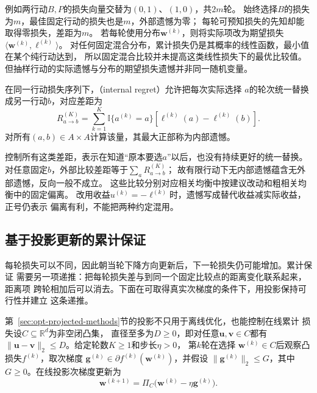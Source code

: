 例如两行动\(B,P\)的损失向量交替为\((0,1)\)、\((1,0)\)，共\(2m\)轮。
始终选择\(B\)的损失为\(m\)，最佳固定行动的损失也是\(m\)，外部遗憾为零；
每轮可预知损失的先知却能取得零损失，差距为\(m\)。
若每轮使用分布\(\bm w^{(k)}\)，则将实际项改为期望损失
\(\langle\bm w^{(k)},\bm\ell^{(k)}\rangle\)。
对任何固定混合分布，累计损失仍是其概率的线性函数，最小值在某个纯行动达到，
所以固定混合比较并未提高这类线性损失下的最优比较值。
但抽样行动的实际遗憾与分布的期望损失遗憾并非同一随机变量。

\begin{definition}[内部遗憾]
\label{def:game-internal-regret}
在同一行动损失序列下，（internal regret）允许把每次实际选择
\(a\)的轮次统一替换成另一行动\(b\)，对应差距为
\[
  R_{a\to b}^{(K)}
  =\sum_{k=1}^K\mathbb I\{a^{(k)}=a\}
    [\ell^{(k)}(a)-\ell^{(k)}(b)].
\]
对所有\((a,b)\in A\times A\)计算该量，其最大正部称为内部遗憾。
\end{definition}
控制所有这类差距，表示在知道“原本要选\(a\)”以后，也没有持续更好的统一替换。
对任意固定\(b\)，外部比较差距等于\(\sum_aR_{a\to b}^{(K)}\)；
故有限行动下无内部遗憾蕴含无外部遗憾，反向一般不成立。
这些比较分别对应相关均衡中按建议改动和粗相关均衡中的固定偏离。
改用收益\(u^{(k)}=-\ell^{(k)}\)时，遗憾写成替代收益减实际收益，正号仍表示
偏离有利，不能把两种约定混用。

\subsection{基于投影更新的累计保证}
\label{sec:game-projection-regret}

每轮损失可以不同，因此朝当轮下降方向更新后，下一轮损失仍可能增加。累计保证
需要另一项递推：把每轮损失差与到同一个固定比较点的距离变化联系起来，距离项
跨轮相加后可以消去。下面在可取得真实次梯度的条件下，用投影保持可行性并建立
这条递推。

第~\ref{sec:opt-projected-methods}节的投影不只用于离线优化，也能控制在线累计
损失设\(C\subseteq\mathbb{R}^d\)为非空闭凸集，
直径至多为\(D\geq0\)，即对任意\(\bm{u},\bm{v}\in C\)都有
\(\lVert\bm{u}-\bm{v}\rVert_2\leq D\)。给定轮数\(K\geq1\)和步长\(\eta>0\)，
第\(k\)轮在选择
\(\bm{w}^{(k)}\in C\)后观察凸损失\(f^{(k)}\)，取次梯度
\(\bm{g}^{(k)}\in\partial f^{(k)}(\bm{w}^{(k)})\)，并假设
\(\lVert\bm{g}^{(k)}\rVert_2\leq G\)，其中\(G\geq0\)。在线投影次梯度更新为
\begin{equation}
  \bm{w}^{(k+1)}
  =
  \Pi_C\bigl(
    \bm{w}^{(k)}-\eta\bm{g}^{(k)}
  \bigr).
  \label{eq:game-online-projected-gradient}
\end{equation}

